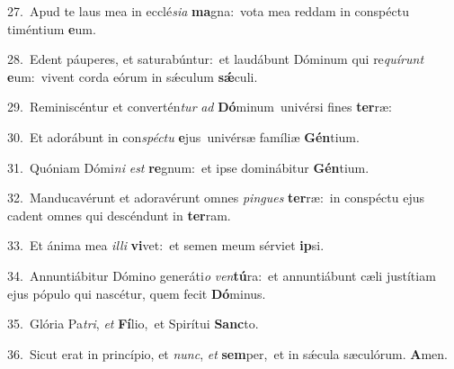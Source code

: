 {\numbfont\textcolor{\numbcolor}{27.}}~Apud te laus mea in ecclé\-\textit{si}\-\textit{a} \textbf{ma}\-gna:~\star vota mea reddam in conspéctu timéntium \textbf{e}\-um.\par
{\numbfont\textcolor{\numbcolor}{28.}}~Edent páuperes, et saturabúntur:~\dagger et laudábunt Dóminum qui re\-\textit{quí}\-\textit{runt} \textbf{e}\-um:~\star vivent corda eórum in sǽculum \textbf{sǽ}\-culi.\par
{\numbfont\textcolor{\numbcolor}{29.}}~Reminiscéntur et convertén\textit{tur} \textit{ad} \textbf{Dó}\-minum~\star univérsi fines \textbf{ter}\-ræ:\par
{\numbfont\textcolor{\numbcolor}{30.}}~Et adorábunt in con\-\textit{spéc}\-\textit{tu} \textbf{e}\-jus~\star univérsæ famíliæ \textbf{Gén}\-tium.\par
{\numbfont\textcolor{\numbcolor}{31.}}~Quóniam Dómi\textit{ni} \textit{est} \textbf{re}\-gnum:~\star et ipse dominábitur \textbf{Gén}\-tium.\par
{\numbfont\textcolor{\numbcolor}{32.}}~Manducavérunt et adoravérunt omnes \textit{pin}\-\textit{gues} \textbf{ter}\-ræ:~\star in conspéctu ejus cadent omnes qui descéndunt in \textbf{ter}\-ram.\par
{\numbfont\textcolor{\numbcolor}{33.}}~Et ánima mea \textit{il}\-\textit{li} \textbf{vi}\-vet:~\star et semen meum sérviet \textbf{ip}\-si.\par
{\numbfont\textcolor{\numbcolor}{34.}}~Annuntiábitur Dómino generáti\textit{o} \textit{ven}\-\textbf{tú}ra:~\star et annuntiábunt cæli justítiam ejus pópulo qui nascétur, quem fecit \textbf{Dó}\-minus.\par
{\numbfont\textcolor{\numbcolor}{35.}}~Glória Pa\-\textit{tri}\-, \textit{et} \textbf{Fí}\-lio,~\star et Spirítui \textbf{Sanc}\-to.\par
{\numbfont\textcolor{\numbcolor}{36.}}~Sicut erat in princípio, et \textit{nunc}\-, \textit{et} \textbf{sem}\-per,~\star et in sǽcula sæculórum. \textbf{A}\-men.\par
